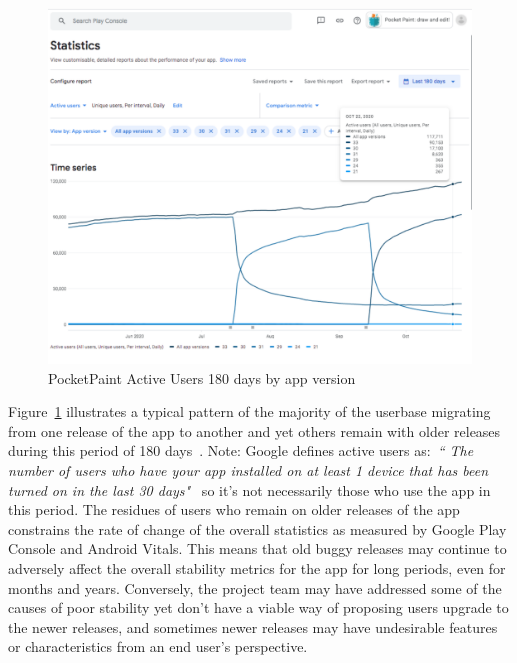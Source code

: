\begin{figure}
    \includegraphics[width=\linewidth]{images/android-vitals-screenshots/catrobat/PocketPaint-ActiveUsers-180days-2020-10-29.pdf}
    \caption{PocketPaint Active Users 180 days by app version}
    \label{fig:pocketpaint-180d-active-users}
\end{figure}

Figure~\ref{fig:pocketpaint-180d-active-users} illustrates a typical pattern of the majority of the userbase migrating from one release of the  app to another and yet others remain with older releases during this period of 180 days~. Note: Google defines active users as:~\emph{``
The number of users who have your app installed on at least 1 device that has been turned on in the last 30 days"}~ so it's not necessarily those who use the app in this period. The residues of users who remain on older releases of the app constrains the rate of change of the overall statistics as measured by Google Play Console and Android Vitals. This means that old buggy releases may continue to adversely affect the overall stability metrics for the app for long periods, even for months and years. Conversely, the project team may have addressed some of the causes of poor stability yet don't have a viable way of proposing users upgrade to the newer releases, and sometimes newer releases may have undesirable features or characteristics from an end user's perspective.

